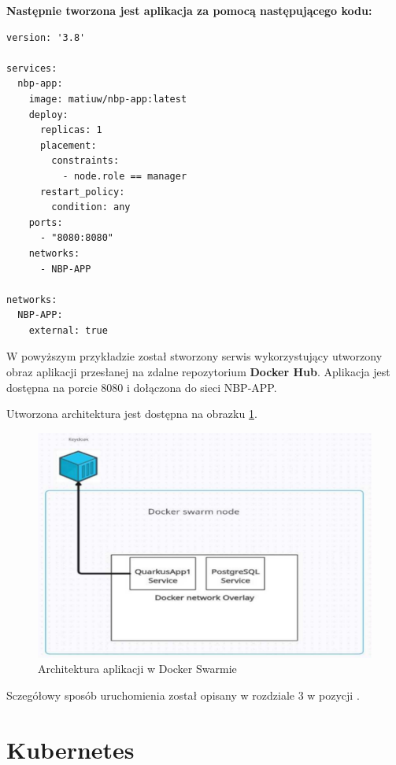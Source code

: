 \documentclass{iiuwb}
\begin{document}
\textbf{Następnie tworzona jest aplikacja za pomocą 
następującego kodu:}

\begin{lstlisting}[breaklines=true]
version: '3.8'

services:
  nbp-app:
    image: matiuw/nbp-app:latest
    deploy:
      replicas: 1
      placement:
        constraints:
          - node.role == manager
      restart_policy:
        condition: any
    ports:
      - "8080:8080"
    networks:
      - NBP-APP

networks:
  NBP-APP:
    external: true
\end{lstlisting}

W powyższym przykładzie został stworzony serwis 
wykorzystujący utworzony obraz aplikacji przesłanej
na zdalne repozytorium \textbf{Docker Hub}. Aplikacja jest
dostępna na porcie 8080 i dołączona do sieci NBP-APP.

Utworzona architektura jest dostępna na obrazku \ref{fig: Architektura aplikacji w Docker Swarmie}.

\begin{figure}[!h]
  \centering
  \includegraphics[width=12cm]{swarm/AplikacjaDockerSwarm.pdf}
  \caption{Architektura aplikacji w Docker Swarmie}
  \label{fig: Architektura aplikacji w Docker Swarmie}
\end{figure}

Sczegółowy sposób uruchomienia został opisany w rozdziale 3 
w pozycji \cite{DockerSwarm}.

\section{Kubernetes}
\label{sec: Kubernetes}
\end{document}
